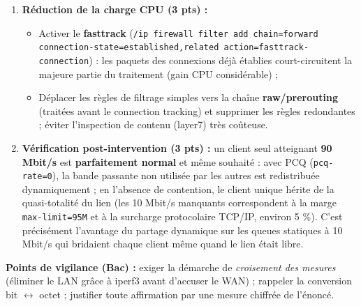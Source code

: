 \documentclass[11pt]{article}
\begin{document}
\begin{corrige}
\begin{enumerate}
\begin{lstlisting}
/queue type add name=pcq-upload kind=pcq pcq-rate=0 \
    pcq-classifier=src-address pcq-total-limit=2000KiB
/queue tree add name=download parent=global queue=pcq-download \
    max-limit=95M
/queue tree add name=upload parent=global queue=pcq-upload \
    max-limit=95M
\end{lstlisting}
    \texttt{pcq-rate=0} signifie « partage équitable sans plafond individuel » : un client seul obtient tout le lien ; 15 clients actifs obtiennent chacun $\approx$ 6,6 Mbit/s. Pour prioriser l'interactif, on ajoute des \emph{mangle rules} marquant les paquets (DNS port 53, ICMP, ports de jeux) avec une priorité supérieure dans l'arbre de files.
    \item \textbf{Réduction de la charge CPU (3 pts) :}
    \begin{itemize}
        \item Activer le \textbf{fasttrack} (\texttt{/ip firewall filter add chain=forward connection-state=established,related action=fasttrack-connection}) : les paquets des connexions déjà établies court-circuitent la majeure partie du traitement (gain CPU considérable) ;
        \item Déplacer les règles de filtrage simples vers la chaîne \textbf{raw/prerouting} (traitées avant le connection tracking) et supprimer les règles redondantes ; éviter l'inspection de contenu (layer7) très coûteuse.
    \end{itemize}
    \item \textbf{Vérification post-intervention (3 pts) :} un client seul atteignant \textbf{90 Mbit/s} est \textbf{parfaitement normal} et même souhaité : avec PCQ (\texttt{pcq-rate=0}), la bande passante non utilisée par les autres est redistribuée dynamiquement ; en l'absence de contention, le client unique hérite de la quasi-totalité du lien (les 10 Mbit/s manquants correspondent à la marge \texttt{max-limit=95M} et à la surcharge protocolaire TCP/IP, environ 5 \%). C'est précisément l'avantage du partage dynamique sur les queues statiques à 10 Mbit/s qui bridaient chaque client même quand le lien était libre.
\end{enumerate}
\textbf{Points de vigilance (Bac) :} exiger la démarche de \emph{croisement des mesures} (éliminer le LAN grâce à iperf3 avant d'accuser le WAN) ; rappeler la conversion bit $\leftrightarrow$ octet ; justifier toute affirmation par une mesure chiffrée de l'énoncé.
\end{corrige}

\newpage
\end{document}
